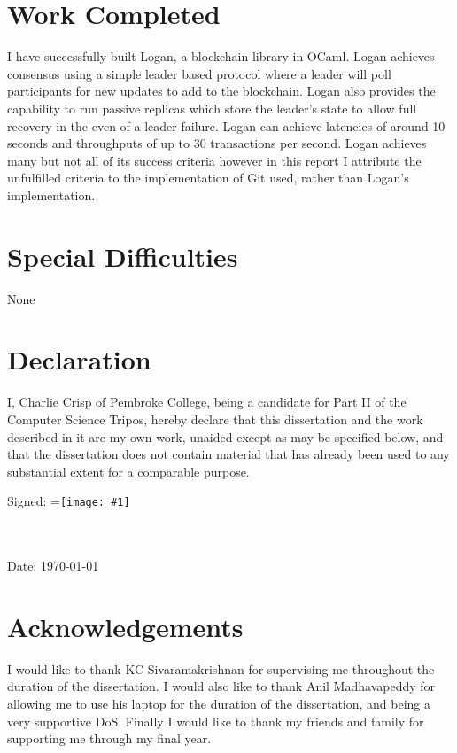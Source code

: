 \documentclass[12pt,a4paper,twoside,openright]{report}
\newcommand{\vcenteredinclude}[1]{\begingroup
	\setbox0=\hbox{\texttt{[image: \#1]}}%
	\parbox{\wd0}{\box0}\endgroup}
\begin{document}
	\section*{Work Completed}
	
	I have successfully built Logan, a blockchain library in OCaml.
	Logan achieves consensus using a simple leader based protocol where a leader will poll participants for new updates to add to the blockchain.
	Logan also provides the capability to run passive replicas which store the leader's state to allow full recovery in the even of a leader failure.
	Logan can achieve latencies of around 10 seconds and throughputs of up to 30 transactions per second. 
	Logan achieves many but not all of its success criteria however in this report I attribute the unfulfilled criteria to the implementation of Git used, rather than Logan's implementation.
	
	\section*{Special Difficulties}
	
	None
	
	\newpage
	\section*{Declaration}
	
	I, Charlie Crisp of Pembroke College, being a candidate for Part II of the Computer
	Science Tripos, hereby declare that this dissertation and the work described in it are my own work,
	unaided except as may be specified below, and that the dissertation
	does not contain material that has already been used to any substantial
	extent for a comparable purpose.
	
	\bigskip
	\noindent 
	Signed:
	\vcenteredinclude{figs/signature.png} \\ \\
	\bigskip
	\noindent 
	Date: \space \space \space \today
	
	\tableofcontents
	
	\listoffigures

	\lstlistoflistings
	
	\newpage
	\section*{Acknowledgements}
	
	I would like to thank KC Sivaramakrishnan for supervising me throughout the duration of the dissertation.
	I would also like to thank Anil Madhavapeddy for allowing me to use his laptop for the duration of the dissertation, and being a very supportive DoS.
	Finally I would like to thank my friends and family for supporting me through my final year.
	
\end{document}
